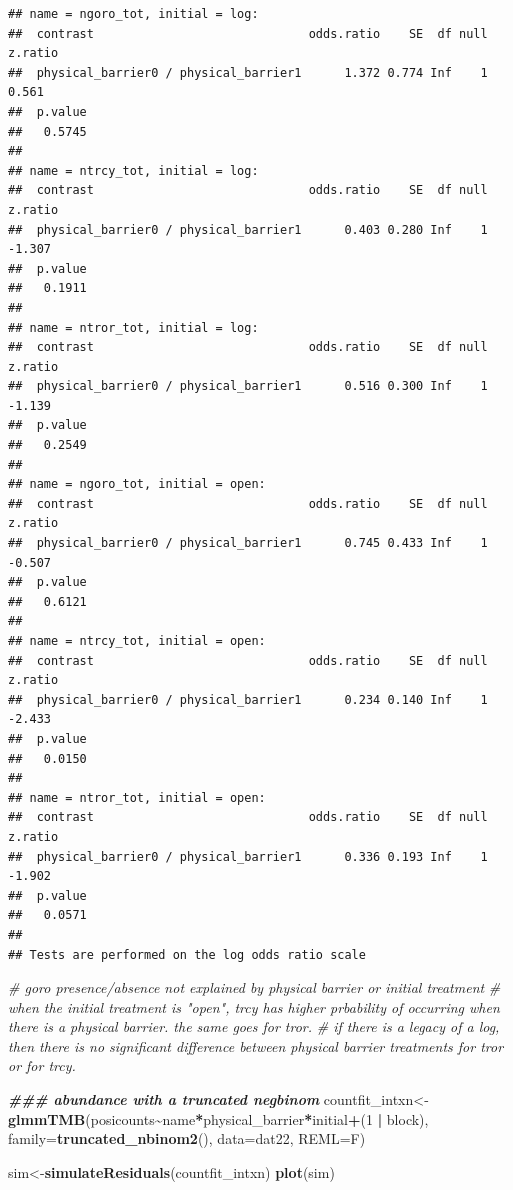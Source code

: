 \documentclass[
]{article}
\newenvironment{Shaded}{\begin{snugshade}}{\end{snugshade}}
\newcommand{\AttributeTok}[1]{\textcolor[rgb]{0.13,0.29,0.53}{#1}}
\newcommand{\CommentTok}[1]{\textcolor[rgb]{0.56,0.35,0.01}{\textit{#1}}}
\newcommand{\DecValTok}[1]{\textcolor[rgb]{0.00,0.00,0.81}{#1}}
\newcommand{\DocumentationTok}[1]{\textcolor[rgb]{0.56,0.35,0.01}{\textbf{\textit{#1}}}}
\newcommand{\FunctionTok}[1]{\textcolor[rgb]{0.13,0.29,0.53}{\textbf{#1}}}
\newcommand{\NormalTok}[1]{#1}
\newcommand{\OtherTok}[1]{\textcolor[rgb]{0.56,0.35,0.01}{#1}}
\newcommand{\SpecialCharTok}[1]{\textcolor[rgb]{0.81,0.36,0.00}{\textbf{#1}}}
\begin{document}
\begin{verbatim}
## name = ngoro_tot, initial = log:
##  contrast                              odds.ratio    SE  df null z.ratio
##  physical_barrier0 / physical_barrier1      1.372 0.774 Inf    1   0.561
##  p.value
##   0.5745
## 
## name = ntrcy_tot, initial = log:
##  contrast                              odds.ratio    SE  df null z.ratio
##  physical_barrier0 / physical_barrier1      0.403 0.280 Inf    1  -1.307
##  p.value
##   0.1911
## 
## name = ntror_tot, initial = log:
##  contrast                              odds.ratio    SE  df null z.ratio
##  physical_barrier0 / physical_barrier1      0.516 0.300 Inf    1  -1.139
##  p.value
##   0.2549
## 
## name = ngoro_tot, initial = open:
##  contrast                              odds.ratio    SE  df null z.ratio
##  physical_barrier0 / physical_barrier1      0.745 0.433 Inf    1  -0.507
##  p.value
##   0.6121
## 
## name = ntrcy_tot, initial = open:
##  contrast                              odds.ratio    SE  df null z.ratio
##  physical_barrier0 / physical_barrier1      0.234 0.140 Inf    1  -2.433
##  p.value
##   0.0150
## 
## name = ntror_tot, initial = open:
##  contrast                              odds.ratio    SE  df null z.ratio
##  physical_barrier0 / physical_barrier1      0.336 0.193 Inf    1  -1.902
##  p.value
##   0.0571
## 
## Tests are performed on the log odds ratio scale
\end{verbatim}

\begin{Shaded}
\begin{Highlighting}[]
\CommentTok{\# goro presence/absence not explained by physical barrier or initial treatment }
\CommentTok{\# when the initial treatment is "open", trcy has higher prbability of occurring when there is a physical barrier. the same goes for tror.}
\CommentTok{\# if there is a legacy of a log, then there is no significant difference between physical barrier treatments for tror or for trcy. }

\DocumentationTok{\#\#\# abundance with a truncated negbinom }
\NormalTok{countfit\_intxn}\OtherTok{\textless{}{-}}\FunctionTok{glmmTMB}\NormalTok{(posicounts}\SpecialCharTok{\textasciitilde{}}\NormalTok{name}\SpecialCharTok{*}\NormalTok{physical\_barrier}\SpecialCharTok{*}\NormalTok{initial}\SpecialCharTok{+}\NormalTok{(}\DecValTok{1} \SpecialCharTok{|}\NormalTok{ block), }\AttributeTok{family=}\FunctionTok{truncated\_nbinom2}\NormalTok{(), }\AttributeTok{data=}\NormalTok{dat22, }\AttributeTok{REML=}\NormalTok{F)}

\NormalTok{sim}\OtherTok{\textless{}{-}}\FunctionTok{simulateResiduals}\NormalTok{(countfit\_intxn)}
\FunctionTok{plot}\NormalTok{(sim)}
\end{Highlighting}
\end{Shaded}
\end{document}
